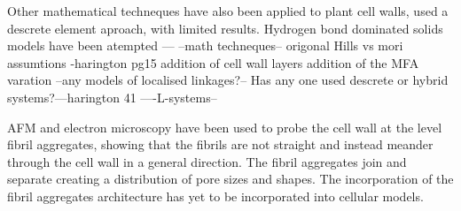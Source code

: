Other mathematical techneques have also been applied to plant cell walls, \cite{HEPWORTH_1998} used a descrete element aproach, with limited results. Hydrogen bond dominated solids models have been atempted ---
--math techneques--
origonal Hills vs mori assumtions -harington pg15 
addition of cell wall layers
addition of the MFA varation
--any models of localised linkages?--
Has any one used descrete or hybrid systems?---harington 41
----L-systems--

AFM and electron microscopy have been used to probe the cell wall at the level fibril aggregates, showing that the fibrils are not straight and instead meander through the cell wall in a general direction. The fibril aggregates join and separate creating a distribution of pore sizes and shapes. The incorporation of the fibril aggregates architecture has yet to be incorporated into cellular models. 
